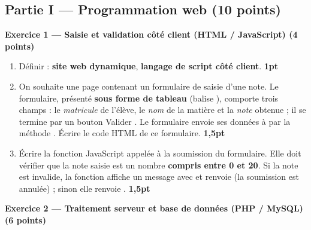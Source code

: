 \subsection*{Partie I — Programmation web \hfill (10 points)}

\textbf{Exercice 1 — Saisie et validation côté client (HTML / JavaScript) \hfill (4 points)}

\begin{enumerate}[label=\textbf{\arabic*-},leftmargin=2.2em]
\item Définir : \textbf{site web dynamique}, \textbf{langage de script côté client}.
\hfill \textbf{1pt}
\item On souhaite une page  contenant un formulaire de saisie d'une
note. Le formulaire, présenté \textbf{sous forme de tableau} (balise ),
comporte trois champs : le \emph{matricule} de l'élève, le \emph{nom} de la matière
et la \emph{note} obtenue ; il se termine par un bouton \og Valider \fg{}. Le
formulaire envoie ses données à  par la méthode .
Écrire le code HTML de ce formulaire. \hfill \textbf{1,5pt}
\item Écrire la fonction JavaScript  appelée à la soumission du
formulaire. Elle doit vérifier que la note saisie est un nombre \textbf{compris entre
0 et 20}. Si la note est invalide, la fonction affiche un message avec 
et renvoie  (la soumission est annulée) ; sinon elle renvoie .
\hfill \textbf{1,5pt}
\end{enumerate}

\medskip
\textbf{Exercice 2 — Traitement serveur et base de données (PHP / MySQL) \hfill (6 points)}

